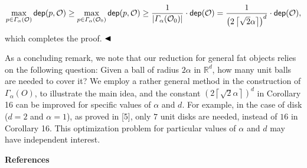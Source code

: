 \documentclass[10pt,a4paper]{article}
\begin{document}
\par
\[\begin{aligned}
\max_{p\in\varGamma_{\alpha}(\mathcal{O})}\mathsf{dep}(p,\mathcal{O})\geq\max_%
{p\in\varGamma_{\alpha}(\mathcal{O}_{0})}\mathsf{dep}(p,\mathcal{O})\geq\frac{%
1}{|\varGamma_{\alpha}(\mathcal{O}_{0})|}\cdot\mathsf{dep}(\mathcal{O})=\frac{%
1}{{\left(2\left\lceil\sqrt{2}\alpha\right\rceil\right)}^{d}}\cdot\mathsf{dep}%
(\mathcal{O}),
\end{aligned}\]
which completes the proof. $\hfill\blacktriangleleft$
\par
\par
As a concluding remark, we note that our reduction for general fat objects relies on the following question: Given a ball of radius $2\alpha$ in $\mathbb{R}^{d}$, how many unit balls are needed to cover it? We employ a rather general method in the construction of $\varGamma_{\alpha}(O)$, to illustrate the main idea, and the constant ${\left(2\left\lceil\sqrt{2}\alpha\right\rceil\right)}^{d}$ in Corollary 16 can be improved for specific values of $\alpha$ and $d$. For example, in the case of disk ($d=2$ and $\alpha=1$), as proved in [5], only $7$ unit disks are needed, instead of $16$ in Corollary 16. This optimization problem for particular values of $\alpha$ and $d$ may have independent interest.
\par
\par
\par\medskip\noindent\textbf{References}\par
\end{document}
